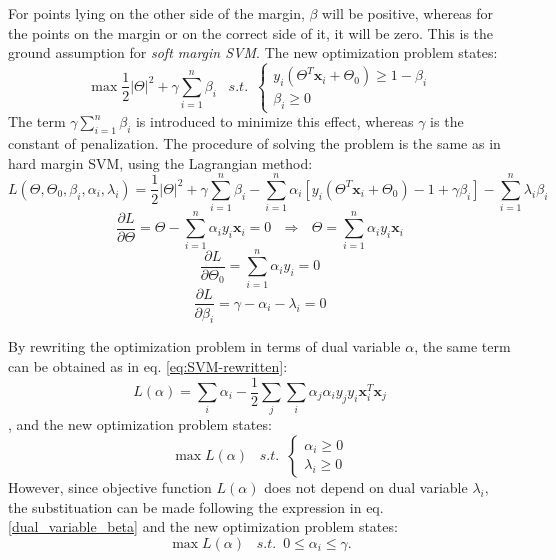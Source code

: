 \begin{appendix}
For points lying on the other side of the margin, $\beta$ will be positive, whereas for the points on the margin or on the correct side of it, it will be zero. This is the ground assumption for \emph{soft margin SVM}. The new optimization problem states:
 \begin{equation} 
\max \frac{1}{2} \vert \Theta \vert ^2 + \gamma \sum_{i=1}^n \beta_i \,\,\,\,\, s.t. \,\,\, \left\{\begin{array}{lr} y_i \left(\Theta^T \mathbf{x}_i + \Theta_0\right) \geq 1 - \beta_i \\
\beta_i \geq 0  \end{array}\right.
\end{equation}
The term $\gamma \sum_{i=1}^n \beta_i$ is introduced to minimize this effect, whereas $\gamma$ is the constant of penalization. The procedure of solving the problem is the same as in hard margin SVM, using the Lagrangian method:
\begin{equation} 
L(\Theta, \Theta_0, \beta_i, \alpha_i, \lambda_i) = \frac{1}{2} \vert \Theta \vert ^2 + \gamma \sum_{i=1}^n \beta_i - \sum_{i=1}^n \alpha_i \left[y_i \left(\Theta^T \mathbf{x}_i + \Theta_0\right) - 1 + \gamma \beta_i \right] - \sum_{i=1}^n \lambda_i \beta_i
\end{equation}
\begin{equation}
\frac{\partial L}{\partial \Theta} = \Theta - \sum_{i=1}^n \alpha_i y_i \mathbf{x}_i = 0 \,\,\,\, \Rightarrow \,\,\,\, \Theta = \sum_{i=1}^n \alpha_i y_i \mathbf{x}_i
\end{equation}
\begin{equation}
\frac{\partial L}{\partial \Theta_0} = \sum_{i=1}^n \alpha_i y_i = 0
\end{equation}
\begin{equation} \label{dual_variable_beta}
\frac{\partial L}{\partial \beta_i} = \gamma - \alpha_i - \lambda_i = 0
\end{equation}

By rewriting the optimization problem in terms of dual variable $\alpha$, the same term can be obtained as in eq. \ref{eq:SVM-rewritten}:
\begin{equation} 
L(\alpha) = \sum_i \alpha_i - \frac{1}{2} \sum_j \sum_i \alpha_j \alpha_i y_j y_i \mathbf{x}_i^T \mathbf{x}_j
\end{equation}
, and the new optimization problem states:
\begin{equation} 
\max L(\alpha) \,\,\,\,\, s.t. \,\,\, \left\{\begin{array}{lr} \alpha_i \geq 0 \\
\lambda_i \geq 0  \end{array}\right.
\end{equation}
However, since objective function $L(\alpha)$ does not depend on dual variable $\lambda_i$, the substituation can be made following the expression in eq. \ref{dual_variable_beta} and the new optimization problem states:
 \begin{equation} 
\max L(\alpha) \,\,\,\,\, s.t. \,\,\, 0 \leq \alpha_i \leq \gamma.
\end{equation}


\end{appendix}
